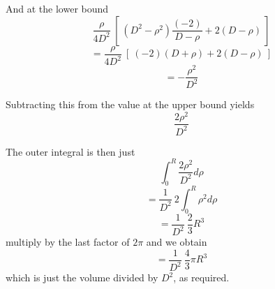 \documentclass[11pt, oneside]{article}   	%
\begin{document}
And at the lower bound
\[ \frac{\rho}{4D^2} \ [ \ (D^2 - \rho^2) \frac{(-2)}{D - \rho} + 2 (D - \rho) \ ] \]
\[ = \frac{\rho}{4D^2} \ [ \ (-2)(D + \rho) + 2(D - \rho) \ ] \]
\[ = - \frac{\rho^2}{D^2} \]

Subtracting this from the value at the upper bound yields
\[ \frac{2 \rho^2}{D^2} \]

The outer integral is then just
\[ \int_0^R  \frac{2 \rho^2}{D^2}   d \rho \]
\[ = \frac{1}{D^2} \ 2 \int_0^R  \rho^2  d \rho \]
\[ = \frac{1}{D^2} \ \frac{2}{3} R^3 \]
multiply by the last factor of $2 \pi$ and we obtain
\[ = \frac{1}{D^2} \ \frac{4}{3} \pi R^3 \]
which is just the volume divided by $D^2$, as required.
\end{document}
